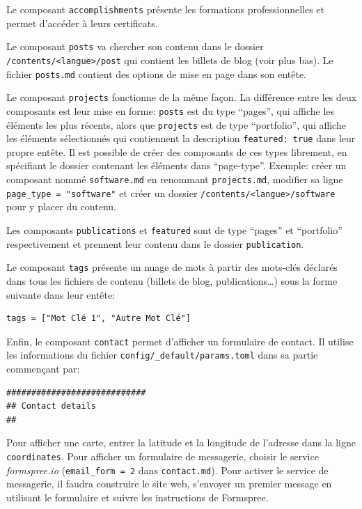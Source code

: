 \documentclass[
  12pt,
  french,
  a4paper,
  extrafontsizes,onecolumn,openright
  ]{memoir}
\begin{document}
Le composant \texttt{accomplishments} présente les formations professionnelles et permet d'accéder à leurs certificats.

Le composant \texttt{posts} va chercher son contenu dans le dossier \texttt{/contents}\break\texttt{/\textless{}langue\textgreater{}/post} qui contient les billets de blog (voir plus bas).
Le fichier \texttt{posts.md} contient des options de mise en page dans son entête.

Le composant \texttt{projects} fonctionne de la même façon.
La différence entre les deux composants est leur mise en forme: \texttt{posts} est du type \enquote{pages}, qui affiche les éléments les plus récents, alors que \texttt{projects} est de type \enquote{portfolio}, qui affiche les éléments sélectionnés qui contiennent la description \texttt{featured:\ true} dans leur propre entête.
Il est possible de créer des composants de ces types librement, en spécifiant le dossier contenant les éléments dans \enquote{page-type}.
Exemple: créer un composant nommé \texttt{software.md} en renommant \texttt{projects.md}, modifier sa ligne \texttt{page\_type\ =\ "software"} et créer un dossier \texttt{/contents/\textless{}langue\textgreater{}/software} pour y placer du contenu.

Les composants \texttt{publications} et \texttt{featured} sont de type \enquote{pages} et \enquote{portfolio} respectivement et prennent leur contenu dans le dossier \texttt{publication}.

Le composant \texttt{tags} présente un nuage de mots à partir des mots-clés déclarés dans tous les fichiers de contenu (billets de blog, publications\ldots) sous la forme suivante dans leur entête:

\begin{verbatim}
tags = ["Mot Clé 1", "Autre Mot Clé"]
\end{verbatim}

Enfin, le composant \texttt{contact} permet d'afficher un formulaire de contact.
Il utilise les informations du fichier \texttt{config/\_default/params.toml} dans sa partie commençant par:

\begin{verbatim}
############################
## Contact details
##
\end{verbatim}

Pour afficher une carte, entrer la latitude et la longitude de l'adresse dans la ligne \texttt{coordinates}.
Pour afficher un formulaire de messagerie, choisir le service \emph{formspree.io} (\texttt{email\_form\ =\ 2} dans \texttt{contact.md}).
Pour activer le service de messagerie, il faudra construire le site web, s'envoyer un premier message en utilisant le formulaire et suivre les instructions de Formspree.
\end{document}
